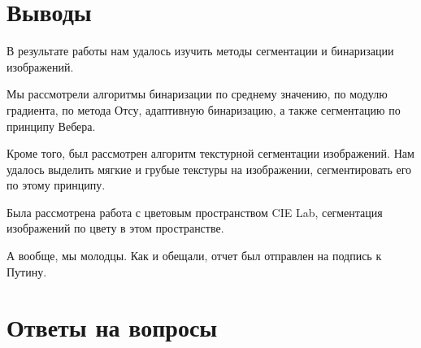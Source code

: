 
\FloatBarrier


\FloatBarrier





\section{Выводы}

В результате работы нам удалось изучить методы сегментации и бинаризации изображений. 

Мы рассмотрели алгоритмы бинаризации по среднему значению, по модулю градиента, 
по метода Отсу, адаптивную бинаризацию, а также сегментацию по принципу Вебера.

Кроме того, был рассмотрен алгоритм текстурной сегментации изображений. 
Нам удалось выделить мягкие и грубые текстуры на изображении, сегментировать его по этому принципу. 

Была рассмотрена работа с цветовым пространством CIE Lab, сегментация изображений по цвету в этом пространстве.

А вообще, мы молодцы. Как и обещали, отчет был отправлен на подпись к Путину. 


\section{Ответы на вопросы}

\setcounter{question}{0}

\newcommand{\question}[1]{\item[Q\refstepcounter{question}\thequestion.] #1}
\newcommand{\answer}[1]{\item[A\thequestion.] #1}


